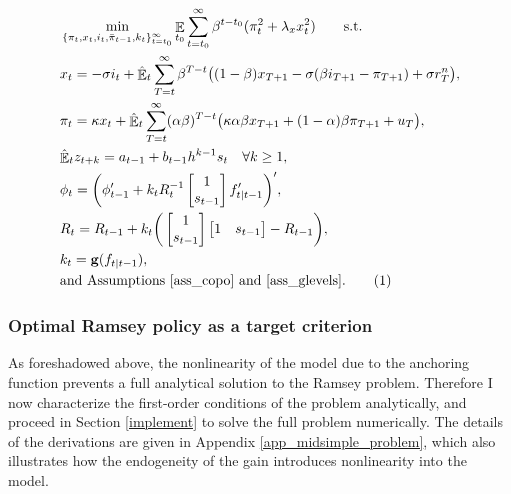 \documentclass[11pt]{article}
\renewcommand{\[}{\begin{equation}}
\renewcommand{\]}{\end{equation}}
\DeclareMathOperator{\E}{\mathbb{E}}
\newcommand\numberthis{\addtocounter{equation}{1}\tag{\theequation}} %
\begin{document}
\begin{align*}
& \min_{ \{\pi_t, x_t, i_t, \bar{\pi}_{t-1}, k_t \}_{t=t_0}^{\infty}} \E_{t_0}\sum_{t=t_0}^{\infty} \beta^{t-t_0} (\pi_t^2  + \lambda_x x_t^2 ) \quad \quad \text{s.t.}  \\
& x_t =  -\sigma i_t +\hat{\E}_t \sum_{T=t}^{\infty} \beta^{T-t }\big( (1-\beta)x_{T+1} - \sigma(\beta i_{T+1} - \pi_{T+1}) +\sigma r_T^n \big), \\
& \pi_t = \kappa x_t +\hat{\E}_t \sum_{T=t}^{\infty} (\alpha\beta)^{T-t }\big( \kappa \alpha \beta x_{T+1} + (1-\alpha)\beta \pi_{T+1} + u_T\big), \\
& \hat{\E}_t z_{t+k} = a_{t-1} + b_{t-1}h^{k-1}s_t  \quad \forall k\geq 1, \\
&\phi_t  = \bigg( \phi_{t-1}' + k_t R_t^{-1}\begin{bmatrix} 1 \\ s_{t-1} \end{bmatrix}f_{t|t-1}' \bigg)', \\
&R_t = R_{t-1} +  k_t \bigg( \begin{bmatrix} 1 \\ s_{t-1} \end{bmatrix} \begin{bmatrix} 1 & s_{t-1} \end{bmatrix}  - R_{t-1} \bigg), \\
& k_t   = \mathbf{g}(f_{t|t-1}), \\
& \text{and Assumptions \ref{ass_copo} and \ref{ass_glevels}.} \label{ramsey_statement} \numberthis 
\end{align*}







 


\subsubsection{Optimal Ramsey policy as a target criterion}

As foreshadowed above, the nonlinearity of the model due to the anchoring function prevents a full analytical solution to the Ramsey problem. Therefore I now characterize the first-order conditions of the problem analytically, and proceed in Section \ref{implement} to solve the full problem numerically. The details of the derivations are given in Appendix \ref{app_midsimple_problem}, which also illustrates how the endogeneity of the gain introduces nonlinearity into the model. 
\end{document}
